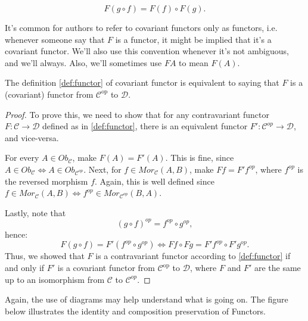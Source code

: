 \begin{definition}[Functor]
\begin{enumerate}[(i)]
\begin{enumerate}
			            \begin{displaymath}
				            F(g \circ f) = F(f) \circ F(g).
			            \end{displaymath}
		      \end{enumerate}
	\end{enumerate}
	It's common for authors to refer to covariant functors only as functors, i.e.
	whenever someone say that $F$ is a functor, it might be implied that it's a covariant functor.
	We'll also use this convention whenever it's not ambiguous, and we'll always.
	Also, we'll sometimes use $FA$ to mean $F(A)$.
	\label{def:functor}
\end{definition}

\begin{lemma}
	The definition \ref{def:functor} of covariant functor is equivalent to
	saying that	$F$ is a (covariant) functor from $\mathcal C^{\text{op}}$ to $\mathcal D$.
	\label{lemma:contravariant}
\end{lemma}
\begin{proof}
	To prove this, we need to show that for any contravariant functor $F:\mathcal C \to \mathcal D$
	defined as in \ref{def:functor}, there is an equivalent functor $F':\mathcal C^{op}\to \mathcal D$,
	and vice-versa.

	For every $A \in Ob_\mathcal C$, make $F(A) = F'(A)$. This is fine, since
	$A \in Ob_\mathcal C \iff A \in Ob_{\mathcal C^{op}}$.
	Next, for $f \in Mor_\mathcal C (A,B)$, make
	$F f = F' f^{op}$, where $f^{op}$ is the reversed morphism $f$. Again, this is well defined since
	$f \in Mor_\mathcal C(A,B) \iff f^{op} \in Mor_{\mathcal C^{op}}(B,A)$.

	Lastly, note that
	\begin{displaymath}
		(g \circ f)^{op} = f^{op} \circ g^{op},
	\end{displaymath}
	hence:
	\begin{displaymath}
		F(g \circ f) = F'(f^{op}\circ g^{op})  \iff F f \circ F g  = F' f^{op} \circ F' g^{op}.
	\end{displaymath}
	Thus, we showed that $F$ is a contravariant functor according to \ref{def:functor}
	if and only if $F'$ is a covariant functor from $\mathcal C^{\text{op}}$ to $\mathcal D$, where
	$F$ and $F'$ are the same up to an isomorphism from $\mathcal C$ to $\mathcal C^{op}$.
\end{proof}

Again, the use of diagrams may help understand what is going on. The figure below
illustrates the identity and composition preservation of Functors.

